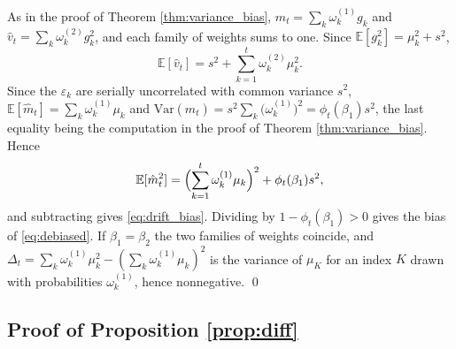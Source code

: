 \documentclass[pdflatex,sn-mathphys-num]{sn-jnl}%
\theoremstyle{thmstyleone}%
\theoremstyle{thmstyletwo}%
\theoremstyle{thmstylethree}%
\newenvironment{revblock}{\color{blue}}{}
\newcommand{\Var}{\mathrm{Var}}
\newcommand{\E}{\mathbb{E}}
\begin{document}
\begin{appendices}
\begin{revblock}
As in the proof of Theorem \ref{thm:variance_bias}, $\hat m_t=\sum_k\omega^{(1)}_kg_k$ and $\hat v_t=\sum_k\omega^{(2)}_kg^2_k$, and each family of weights sums to one. Since $\E[g^2_k]=\mu^2_k+s^2$,
\begin{equation}
\E[\hat v_t]=s^2+\sum_{k=1}^{t}\omega^{(2)}_k\mu^2_k .
\end{equation}
Since the $\varepsilon_k$ are serially uncorrelated with common variance $s^2$, $\E[\hat m_t]=\sum_k\omega^{(1)}_k\mu_k$ and $\Var(\hat m_t)=s^2\sum_k\bigl(\omega^{(1)}_k\bigr)^2=\phi_t(\beta_1)s^2$, the last equality being the computation in the proof of Theorem \ref{thm:variance_bias}. Hence
\begin{equation}
\E[\hat m^2_t]=\Bigl(\sum_{k=1}^{t}\omega^{(1)}_k\mu_k\Bigr)^{2}+\phi_t(\beta_1)s^2 ,
\end{equation}
and subtracting gives \eqref{eq:drift_bias}. Dividing by $1-\phi_t(\beta_1)>0$ gives the bias of \eqref{eq:debiased}. If $\beta_1=\beta_2$ the two families of weights coincide, and $\Delta_t=\sum_k\omega^{(1)}_k\mu^2_k-(\sum_k\omega^{(1)}_k\mu_k)^2$ is the variance of $\mu_K$ for an index $K$ drawn with probabilities $\omega^{(1)}_k$, hence nonnegative. \qed

\subsection*{Proof of Proposition \ref{prop:diff}}


\end{revblock}
\end{appendices}
\end{document}
